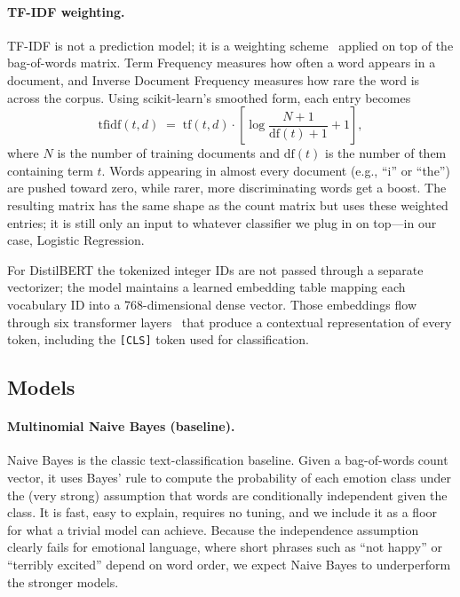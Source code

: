 \documentclass{article}
\theoremstyle{plain}
\begin{document}
\paragraph{TF-IDF weighting.} TF-IDF is not a prediction model; it is a
weighting scheme~\cite{jones1972statistical} applied on top of the
bag-of-words matrix. Term Frequency measures how often a word appears in a
document, and Inverse Document Frequency measures how rare the word is
across the corpus. Using scikit-learn's smoothed form, each entry becomes
\begin{equation}
  \mathrm{tfidf}(t, d) \;=\; \mathrm{tf}(t, d) \cdot
    \left[ \log \frac{N+1}{\mathrm{df}(t)+1} + 1 \right],
  \label{eq:tfidf}
\end{equation}
where $N$ is the number of training documents and $\mathrm{df}(t)$ is the
number of them containing term $t$. Words appearing in almost every
document (e.g., ``i'' or ``the'') are pushed toward zero, while rarer,
more discriminating words get a boost. The resulting matrix has the same
shape as the count matrix but uses these weighted entries; it is still
only an input to whatever classifier we plug in on top---in our case,
Logistic Regression.

For DistilBERT the tokenized integer IDs are not passed through a separate
vectorizer; the model maintains a learned embedding table mapping each
vocabulary ID into a 768-dimensional dense vector. Those embeddings flow
through six transformer
layers~\cite{vaswani2017attention,devlin2019bert,sanh2019distilbert} that
produce a contextual representation of every token, including the
\texttt{[CLS]} token used for classification.

\subsection{Models}
\label{sec:models}

\paragraph{Multinomial Naive Bayes (baseline).} Naive Bayes is the classic
text-classification baseline. Given a bag-of-words count vector, it uses
Bayes' rule to compute the probability of each emotion class under the
(very strong) assumption that words are conditionally independent given
the class. It is fast, easy to explain, requires no tuning, and we include
it as a floor for what a trivial model can achieve. Because the
independence assumption clearly fails for emotional language, where short
phrases such as ``not happy'' or ``terribly excited'' depend on word
order, we expect Naive Bayes to underperform the stronger models.
\end{document}
